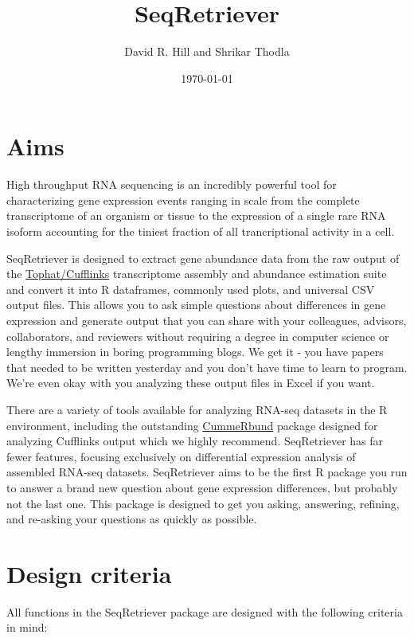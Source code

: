 \documentclass[11pt]{article}
\author{David R. Hill and Shrikar Thodla}
\date{\today}
\title{SeqRetriever}
\begin{document}
\maketitle
\tableofcontents

\section{Aims}
\label{sec-1}
High throughput RNA sequencing is an incredibly powerful tool for characterizing gene expression events ranging in scale from the complete transcriptome of an organism or tissue to the expression of a single rare RNA isoform accounting for the tiniest fraction of all trancriptional activity in a cell.  

SeqRetriever is designed to extract gene abundance data from the raw output of the \href{http://cole-trapnell-lab.github.io/cufflinks/}{Tophat/Cufflinks} transcriptome assembly and abundance estimation suite and convert it into R dataframes, commonly used plots, and universal CSV output files. This allows you to ask simple questions about differences in gene expression and generate output that you can share with your colleagues, advisors, collaborators, and reviewers without requiring a degree in computer science or lengthy immersion in boring programming blogs. We get it - you have papers that needed to be written yesterday and you don't have time to learn to program. We're even okay with you analyzing these output files in Excel if you want.

There are a variety of tools available for analyzing RNA-seq datasets in the R environment, including the outstanding \href{http://compbio.mit.edu/cummeRbund/}{CummeRbund} package designed for analyzing Cufflinks output which we highly recommend. SeqRetriever has far fewer features, focusing exclusively on differential expression analysis of assembled RNA-seq datasets. SeqRetriever aims to be the first R package you run to answer a brand new question about gene expression differences, but probably not the last one. This package is designed to get you asking, answering, refining, and re-asking your questions as quickly as possible.

\section{Design criteria}
\label{sec-2}
All functions in the SeqRetriever package are designed with the following criteria in mind:
\end{document}
